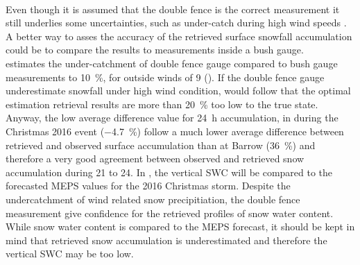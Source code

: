 \\
Even though it is assumed that the double fence is the correct measurement it still underlies some uncertainties, such as under-catch during high wind speeds \citep{wolff_wmo_2018}. 
A better way to asses the accuracy of the retrieved surface snowfall accumulation could be to compare the results to measurements inside a bush gauge. 
\\
\citet{wolff_wmo_2018} estimates the under-catchment of double fence gauge compared to bush gauge measurements to \SI{10}{\percent}, for outside winds of \SI{9}{\mPs} ().
If the double fence gauge underestimate snowfall under high wind condition, would follow that the optimal estimation retrieval results are more than \SI{20}{\percent} too low to the true state. 
\\
Anyway, the low average difference value for \SI{24}{\hour} accumulation, in  during the Christmas 2016 event (\SI{-4.7}{\percent}) follow a much lower average difference between retrieved and observed surface accumulation than at Barrow (\SI{36}{\percent}) and therefore a very good agreement between observed and retrieved snow accumulation during \num{21} to \SI{24}{\dec}. In , the vertical SWC will be compared to the forecasted MEPS values for the 2016 Christmas storm. Despite the undercatchment of wind related snow precipitiation, the double fence measurement give confidence for the retrieved profiles of snow water content. While snow water content is compared to the MEPS forecast, it should be kept in mind that retrieved snow accumulation is underestimated and therefore the vertical SWC may be too low.


